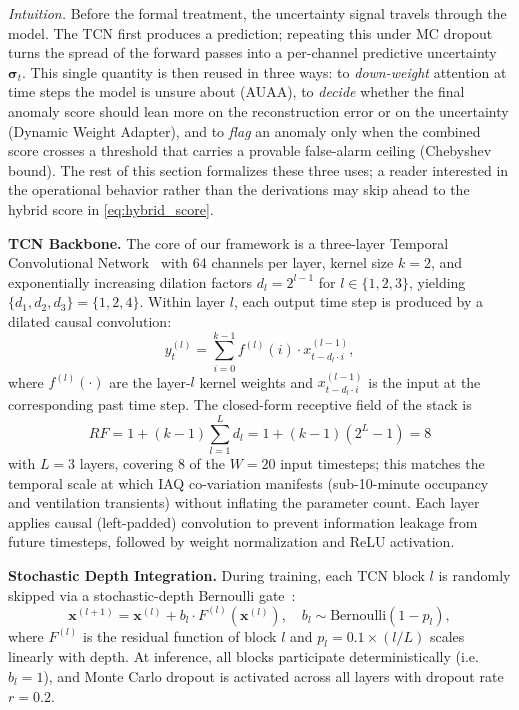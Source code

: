 \textit{Intuition.} Before the formal treatment, the uncertainty signal travels through the model. The TCN first produces a prediction; repeating this under MC dropout turns the spread of the forward passes into a per-channel predictive uncertainty $\boldsymbol{\sigma}_t$. This single quantity is then reused in three ways: to \emph{down-weight} attention at time steps the model is unsure about (AUAA), to \emph{decide} whether the final anomaly score should lean more on the reconstruction error or on the uncertainty (Dynamic Weight Adapter), and to \emph{flag} an anomaly only when the combined score crosses a threshold that carries a provable false-alarm ceiling (Chebyshev bound). The rest of this section formalizes these three uses; a reader interested in the operational behavior rather than the derivations may skip ahead to the hybrid score in \cref{eq:hybrid_score}.


\textbf{TCN Backbone.} The core of our framework is a three-layer Temporal Convolutional Network~\cite{bai2018tcn, oord2016wavenet} with 64 channels per layer, kernel size $k=2$, and exponentially increasing dilation factors $d_l = 2^{l-1}$ for $l \in \{1,2,3\}$, yielding $\{d_1, d_2, d_3\} = \{1, 2, 4\}$. Within layer $l$, each output time step is produced by a dilated causal convolution:
\begin{equation}
y_t^{(l)} = \sum_{i=0}^{k-1} f^{(l)}(i) \cdot x_{t - d_l \cdot i}^{(l-1)},
\label{eq:dilated_conv}
\end{equation}
where $f^{(l)}(\cdot)$ are the layer-$l$ kernel weights and $x_{t-d_l\cdot i}^{(l-1)}$ is the input at the corresponding past time step. The closed-form receptive field of the stack is
\begin{equation}
RF = 1 + (k-1)\sum_{l=1}^{L} d_l = 1 + (k-1)(2^{L} - 1) = 8
\label{eq:receptive_field}
\end{equation}
with $L=3$ layers, covering 8 of the $W=20$ input timesteps; this matches the temporal scale at which IAQ co-variation manifests (sub-10-minute occupancy and ventilation transients) without inflating the parameter count. Each layer applies causal (left-padded) convolution to prevent information leakage from future timesteps, followed by weight normalization and ReLU activation.

\textbf{Stochastic Depth Integration.} During training, each TCN block $l$ is randomly skipped via a stochastic-depth Bernoulli gate~\cite{he2016deep}:
\begin{equation}
\mathbf{x}^{(l+1)} = \mathbf{x}^{(l)} + b_l \cdot F^{(l)}(\mathbf{x}^{(l)}), \quad b_l \sim \mathrm{Bernoulli}(1 - p_l),
\label{eq:stochastic_depth}
\end{equation}
where $F^{(l)}$ is the residual function of block $l$ and $p_l = 0.1 \times (l/L)$ scales linearly with depth. At inference, all blocks participate deterministically (i.e.\ $b_l=1$), and Monte Carlo dropout is activated across all layers with dropout rate $r=0.2$.




